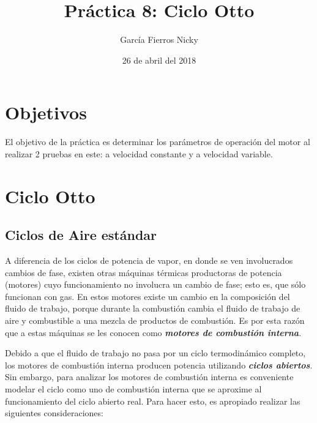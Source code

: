 \documentclass{article}
\title{Pr\'{a}ctica 8: Ciclo Otto}
\author{Garc\'{i}a Fierros Nicky}
\date{26 de abril del 2018}
\begin{document}
    \maketitle
    \newpage

    \tableofcontents
    \newpage
    
    \section{Objetivos}
        El objetivo de la pr\'{a}ctica es determinar los par\'{a}metros de operaci\'{o}n del motor
        al realizar 2 pruebas en este: a velocidad constante y a velocidad variable.
    
    \section{Ciclo Otto}
        \subsection{Ciclos de Aire est\'{a}ndar}
            A diferencia de los ciclos de potencia de vapor, en donde se ven involucrados cambios de fase, existen otras m\'{a}quinas t\'{e}rmicas productoras de
            potencia (motores) cuyo funcionamiento no involucra un cambio de fase; esto es, que s\'{o}lo funcionan con gas. En estos motores existe un cambio
            en la composici\'{o}n del fluido de trabajo, porque durante la combusti\'{o}n cambia el fluido de trabajo de aire y combustible a una mezcla
            de productos de combusti\'{o}n. Es por esta raz\'{o}n que a estas m\'{a}quinas se les conocen como \textit{\textbf{motores de combusti\'{o}n interna}}.

            Debido a que el fluido de trabajo no pasa por un ciclo termodin\'{a}mico completo, los motores de combusti\'{o}n interna producen potencia
            utilizando \textbf{\textit{ciclos abiertos}}. Sin embargo, para analizar los motores de combusti\'{o}n interna es conveniente modelar el ciclo como uno 
            de combusti\'{o}n interna que se aproxime al funcionamiento del ciclo abierto real. Para hacer esto, es apropiado realizar las siguientes 
            consideraciones:
\end{document}
